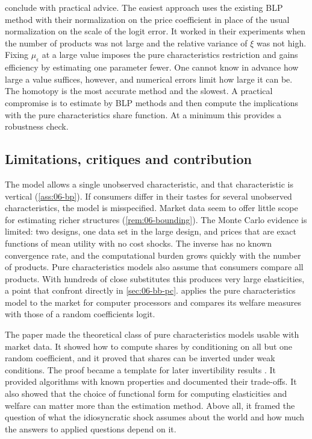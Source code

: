 \citet[pp.~36--37]{BerryPakes2007} conclude with practical advice. The easiest approach uses the existing BLP method with
their normalization on the price coefficient in place of the usual normalization on the scale of the logit error. It
worked in their experiments when the number of products was not large and the relative variance of $\xi$ was not high.
Fixing $\mu_\epsilon$ at a large value imposes the pure characteristics restriction and gains efficiency by estimating one
parameter fewer. One cannot know in advance how large a value suffices, however, and numerical errors limit how large it
can be. The homotopy is the most accurate method and the slowest. A practical compromise is to estimate by BLP methods and
then compute the implications with the pure characteristics share function. At a minimum this provides a robustness check.

\subsection{Limitations, critiques and contribution}\label{sec:06-bp-critique}

The model allows a single unobserved characteristic, and that characteristic is vertical (\cref{ass:06-bp}). If
consumers differ in their tastes for several unobserved characteristics, the model is misspecified. Market data seem to
offer little scope for estimating richer structures (\cref{rem:06-bounding}). The Monte Carlo evidence is limited: two
designs, one data set in the large design, and prices that are exact functions of mean utility with no cost shocks. The
inverse has no known convergence rate, and the computational burden grows quickly with the number of products. Pure
characteristics models also assume that consumers compare all products. With hundreds of close substitutes this
produces very large elasticities, a point that \citet{BajariBenkard2005} confront directly in \cref{sec:06-bb-pc}.
\citet{Song2007} applies the pure characteristics model to the market for computer processors and compares its welfare
measures with those of a random coefficients logit.

The paper made the theoretical class of pure characteristics models usable with market data. It showed how to compute
shares by conditioning on all but one random coefficient, and it proved that shares can be inverted under weak conditions.
The proof became a template for later invertibility results \citep{BerryGandhiHaile2013}. It provided algorithms with
known properties and documented their trade-offs. It also showed that the choice of functional form for computing
elasticities and welfare can matter more than the estimation method. Above all, it framed the question of what the
idiosyncratic shock assumes about the world and how much the answers to applied questions depend on it.

